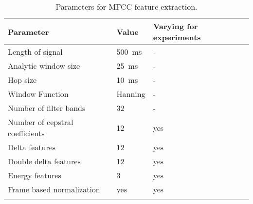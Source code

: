 \begin{table}[ht!]
\begin{center}
\caption{Parameters for MFCC feature extraction.}
\begin{tabular}{ M{6cm}  M{2cm} M{2cm}}
\toprule
\textbf{Parameter} & \textbf{Value} & \textbf{Varying for experiments} \\
\midrule
Length of signal & \SI{500}{\milli\second} & - \\
Analytic window size & \SI{25}{\milli\second} & -\\
Hop size & \SI{10}{\milli\second} & -\\
Window Function & Hanning & -\\
\midrule
Number of filter bands & 32 & -\\
Number of cepstral coefficients & 12 & yes\\
Delta features & 12 & yes \\
Double delta features & 12 & yes \\
Energy features & 3 & yes \\
Frame based normalization & yes & yes\\
\bottomrule
\label{tab:exp_details_params_feature}
\end{tabular}
\end{center}
\end{table}
\FloatBarrier
\noindent